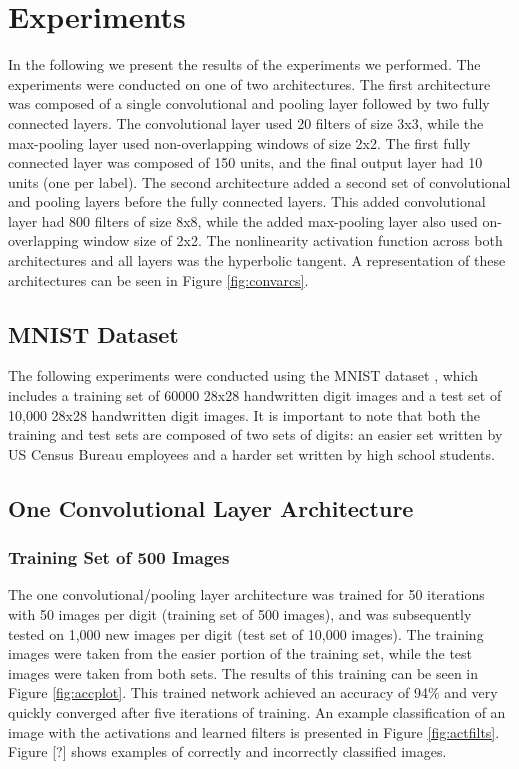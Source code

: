 \documentclass[10pt,twocolumn,letterpaper]{article}
\begin{document}
\section{Experiments}

In the following we present the results of the experiments we performed. The experiments were conducted
on one of two architectures. The first architecture was composed of a single convolutional and pooling
layer followed by two fully connected layers. The convolutional layer used 20 filters of size 3x3,
while the max-pooling layer used non-overlapping windows of size 2x2. The first fully connected layer
was composed of 150 units, and the final output layer had 10 units (one per label). The second
architecture added a second set of convolutional and pooling layers before the fully connected layers.
This added convolutional layer had 800 filters of size 8x8, while the added max-pooling layer also used
on-overlapping window size of 2x2. The nonlinearity activation function across both architectures and
all layers was the hyperbolic tangent. A representation of these architectures can be seen in Figure
\ref{fig:convarcs}.

\subsection{MNIST Dataset}

The following experiments were conducted using the MNIST dataset \cite{MNIST}, which includes a training set of
60000 28x28 handwritten digit images and a test set of 10,000 28x28 handwritten digit images.
It is important to note that both the training and test sets are composed of two sets of digits:
an easier set written by US Census Bureau employees and a harder set written by high school students.

\subsection{One Convolutional Layer Architecture}

\subsubsection{Training Set of 500 Images}

The one convolutional/pooling layer architecture was trained for 50 iterations with 50 images per digit
(training set of 500 images), and was subsequently tested on
1,000 new images per digit (test set of 10,000 images).
The training images were taken from the easier portion of the training set, while the test images were taken from
both sets. The results of this training can be seen in Figure \ref{fig:accplot}. This trained network achieved an
accuracy of 94\% and very quickly converged after five iterations of training. An example
classification of an image with the activations and learned filters is presented
in Figure \ref{fig:actfilts}. Figure [?] shows examples of correctly and incorrectly classified images.
\end{document}
